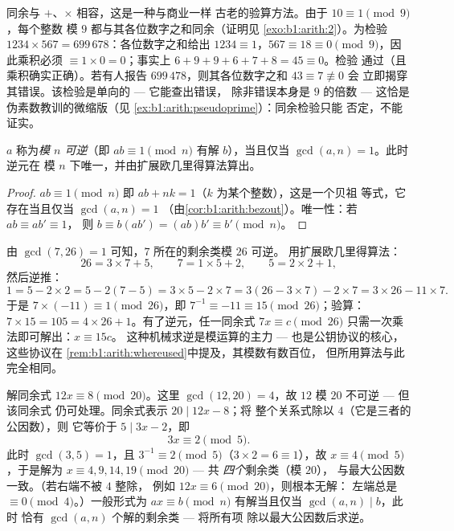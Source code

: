 \begin{example}[弃九法]\label{ex:b1:arith:castingnines}
同余与 $+$、$\times$ 相容，这是一种与商业一样
古老的验算方法。由于 $10 \equiv 1 \pmod 9$，每个整数
模 $9$ 都与其各位数字之和同余（证明见
\cref{exo:b1:arith:2}）。为检验 $1234 \times 567 =
699\,678$：各位数字之和给出 $1234 \equiv 1$，$567 \equiv 18
\equiv 0 \pmod 9$，因此乘积必须 $\equiv 1 \times 0 =
0$；事实上 $6 + 9 + 9 + 6 + 7 + 8 = 45 \equiv 0$。检验
通过（且乘积确实正确）。若有人报告
$699\,478$，则其各位数字之和 $43 \equiv 7 \not\equiv 0$ 会
立即揭穿其错误。该检验是单向的 --- 它能查出错误，
除非错误本身是 $9$ 的倍数 --- 这恰是
伪素数教训的微缩版（见
\cref{ex:b1:arith:pseudoprime}）：同余检验只能
否定，不能证实。
\end{example}

\begin{proposition}[模 $n$ 的可逆性]\label{prop:b1:arith:invmod}
$a$ 称为\emph{模 $n$ 可逆}（即 $ab \equiv 1 \pmod n$
有解 $b$），当且仅当 $\gcd(a, n) = 1$。此时逆元在
模 $n$ 下唯一，并由扩展欧几里得算法算出。
\end{proposition}

\begin{proof}
$ab \equiv 1 \pmod n$ 即 $ab + nk = 1$（$k$ 为某个整数），这是一个贝祖
等式，它存在当且仅当 $\gcd(a,n) = 1$
（由\cref{cor:b1:arith:bezout}）。唯一性：若 $ab \equiv ab' \equiv 1$，
则 $b \equiv b(ab') = (ab)b' \equiv b' \pmod n$。
\end{proof}

\begin{example}[求 $7$ 模 $26$ 的逆元]\label{ex:b1:arith:inv7mod26}
由 $\gcd(7, 26) = 1$ 可知，$7$ 所在的剩余类模 $26$ 可逆。
用扩展欧几里得算法：
\[
26 = 3 \times 7 + 5, \qquad
7 = 1 \times 5 + 2, \qquad
5 = 2 \times 2 + 1 ,
\]
然后逆推：
\[
1 = 5 - 2 \times 2 = 5 - 2(7 - 5) = 3 \times 5 - 2 \times 7
= 3(26 - 3 \times 7) - 2 \times 7 = 3 \times 26 - 11 \times 7 .
\]
于是 $7 \times (-11) \equiv 1 \pmod{26}$，即 $7^{-1} \equiv
-11 \equiv 15 \pmod{26}$；验算：$7 \times 15 = 105 = 4 \times 26
+ 1$。有了逆元，任一同余式 $7x \equiv c
\pmod{26}$ 只需一次乘法即可解出：$x \equiv 15c$。
这种机械求逆是模运算的主力 ---
也是公钥协议的核心，这些协议在
\cref{rem:b1:arith:whereused}中提及，其模数有数百位，
但所用算法与此完全相同。
\end{example}

\begin{example}[系数不可逆的情形]\label{ex:b1:arith:noninvertible}
解同余式 $12x \equiv 8 \pmod{20}$。这里 $\gcd(12, 20) = 4$，故 $12$
模 $20$ 不可逆 --- 但该同余式
仍可处理。同余式表示 $20 \mid 12x - 8$；将
整个关系式除以 $4$（它是三者的公因数），则
它等价于 $5 \mid 3x - 2$，即
\[
3x \equiv 2 \pmod 5 .
\]
此时 $\gcd(3, 5) = 1$，且 $3^{-1} \equiv 2 \pmod 5$（$3 \times 2 =
6 \equiv 1$），故 $x \equiv 4 \pmod 5$，于是解为 $x
\equiv 4, 9, 14, 19 \pmod{20}$ --- 共 \emph{四个}剩余类（模 $20$），
与最大公因数一致。（若右端不被 $4$ 整除，
例如 $12x \equiv 6 \pmod{20}$，则根本无解：
左端总是 $\equiv 0 \pmod 4$。）一般形式为 $ax
\equiv b \pmod n$ 有解当且仅当 $\gcd(a, n) \mid b$，此时
恰有 $\gcd(a, n)$ 个解的剩余类 --- 将所有项
除以最大公因数后求逆。
\end{example}

